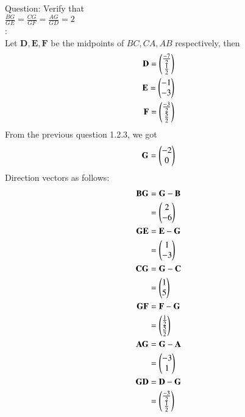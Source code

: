 \documentclass[journal,12pt,onecolumn]{IEEEtran}
\theoremstyle{remark}
\begin{document}
\let\vec\mathbf




\vspace{3cm}



\bigskip

\renewcommand{\thefigure}{\theenumi}
\renewcommand{\thetable}{\theenumi}
Question: Verify that\\
$\frac{BG}{GE}=\frac{CG}{GF}=\frac{AG}{GD}=2$
\\ \solution:\\
Let $\vec{D},\vec{E},\vec{F}$ be the midpoints of $BC,CA,AB$ respectively, then
\begin{align}
\vec{D} = \myvec{\frac{-7}{2}\\\frac{1}{2}}\\
\vec{E} = \myvec{-1\\-3}\\
\vec{F} = \myvec{\frac{-3}{2}\\\frac{5}{2}}
\end{align}
From the previous question 1.2.3, we got
\begin{align}
\vec{G}=\myvec{-2\\0}
\end{align}
Direction vectors as follows: \\
\begin{align}
\vec{B}\vec{G}&=\vec{G}-\vec{B}\\
              &=\myvec{2\\-6}\\
\vec{G}\vec{E}&=\vec{E}-\vec{G}\\
              &=\myvec{1\\-3}\\
\vec{C}\vec{G}&=\vec{G}-\vec{C}\\
              &=\myvec{1\\5}\\
\vec{G}\vec{F}&=\vec{F}-\vec{G}\\
              &=\myvec{\frac{1}{2}\\\frac{5}{2}}\\
\vec{A}\vec{G}&=\vec{G}-\vec{A}\\
              &=\myvec{-3\\1}\\
\vec{G}\vec{D}&=\vec{D}-\vec{G}\\
              &=\myvec{\frac{-3}{2}\\\frac{1}{2}}
\end{align}
\end{document}
